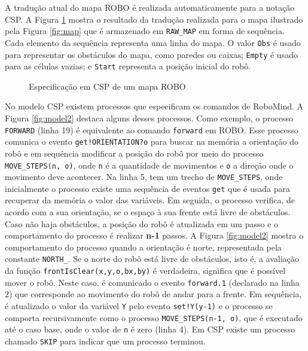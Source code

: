 
A tradução atual do mapa ROBO é realizada automaticamente para a notação CSP. A Figura \ref{fig:mapcsp} mostra o resultado da tradução realizada para o mapa ilustrado pela Figura \ref{fig:map} que é armazenado em \texttt{RAW\_MAP} em forma de sequência. Cada elemento da sequência representa uma linha do mapa. O valor \texttt{Obs} é usado para representar os obstáculos do mapa, como paredes ou caixas; \texttt{Empty} é usado para as células vazias; e \texttt{Start} representa a posição inicial do robô.

\begin{figure}[h]
\caption{Especificação em CSP de um mapa ROBO}

\label{fig:mapcsp}
\end{figure}

No modelo CSP existem processos que especificam os comandos de RoboMind. A Figura \ref{fig:model2} destaca alguns desses processos. Como exemplo, o processo \texttt{FORWARD} (linha 19) é equivalente ao comando \texttt{forward} em ROBO. Esse processo comunica o evento \texttt{get!ORIENTATION?o} para buscar na memória a orientação do robô e em sequência modificar a posição do robô por meio do processo \texttt{MOVE\_STEPS(n, o)}, onde \texttt{n} é a quantidade de movimentos e \texttt{o} a direção onde o movimento deve acontecer. Na linha 5, tem um trecho de \texttt{MOVE\_STEPS}, onde inicialmente o processo existe uma sequência de eventos \texttt{get} que é usada para recuperar da memória o valor das variáveis. Em seguida, o processo verifica, de acordo com a sua orientação, se o espaço à sua frente está livre de obstáculos. Caso não haja obstáculos, a posição do robô é atualizada em um passo e o comportamento do processo é realizar \textbf{n-1} passos. A Figura \ref{fig:model2} mostra o comportamento do processo quando a orientação é norte, representada pela constante \texttt{NORTH\_}. Se o norte do robô está livre de obstáculos, isto é, a avaliação da função \texttt{frontIsClear(x,y,o,bx,by)} é verdadeira, significa que é possível mover o robô. Neste caso, é comunicado o evento \texttt{forward.1} (declarado na linha 2) que corresponde ao movimento do robô de andar para a frente. Em sequência, é atualizado o valor da variável \texttt{Y} pelo evento \texttt{set!Y(y-1)} e o processo se comporta recursivamente como o processo \texttt{MOVE\_STEPS(n-1, o)}, que é executado até o caso base, onde o valor de \texttt{n} é zero (linha 4). Em CSP existe um processo chamado \texttt{SKIP} para indicar que um processo terminou. 


